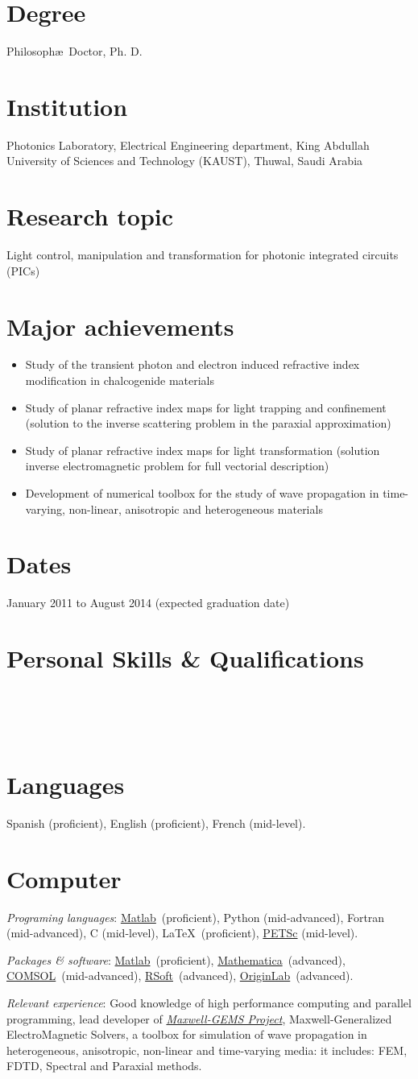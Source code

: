 \documentclass[margin,10pt]{res}
\newcommand{\R}{\textsuperscript{\textregistered}}
\newcommand{\subs}[1]{\normalfont #1}
\newcommand{\httpmg}{http://github.com/damiansra/maxwell-gems}
\newcommand{\secs}[1]{\normalsize{\section{\subs{#1}}}}
\newcommand{\KAUST}{King Abdullah University of Sciences and Technology (KAUST)}
\begin{document}
\secs{Degree}
Philosoph\ae~Doctor, Ph. D.
\secs{Institution} 
Photonics Laboratory, Electrical Engineering department, \KAUST, Thuwal, Saudi Arabia
\secs{Research topic} 
Light control, manipulation and transformation for photonic integrated circuits (PICs)
\secs{Major achievements}
\begin{itemize}
	\item Study of the transient photon and electron induced refractive index modification in chalcogenide materials
	\item Study of planar refractive index maps for light trapping and confinement (solution to the inverse scattering problem in the paraxial approximation)
	\item Study of planar refractive index maps for light transformation (solution inverse electromagnetic problem for full vectorial description)
	\item Development of numerical toolbox for the study of wave propagation in time-varying, non-linear, anisotropic and heterogeneous materials  
\end{itemize} 

\secs{Dates} January 2011 to August 2014 (expected graduation date) \\


\section{Personal Skills \& Qualifications}

\secs{~~}
\secs{Languages}
Spanish (proficient), English (proficient), French (mid-level).

\secs{Computer}
\emph{Programing languages}: \href{http://www.matlab.com}{Matlab\R}~(proficient), Python (mid-advanced), Fortran (mid-advanced), C (mid-level), \LaTeX~(proficient), \href{http://www.mcs.anl.gov/petsc/}{PETSc} (mid-level).

\emph{Packages \& software}: \href{http://www.matlab.com}{Matlab\R}~(proficient), \href{http://www.wolfram.com/mathematica/}{Mathematica\R}~(advanced), \href{http://www.comsol.com}{COMSOL\R}~(mid-advanced), \href{http://www.rsoftdesign.com/}{RSoft\R}~(advanced), \href{http://www.originlab.com}{OriginLab\R}~(advanced).

\emph{Relevant experience}: Good knowledge of high performance computing and parallel programming, lead developer of \href{\httpmg}{\emph{Maxwell-GEMS Project}}, Maxwell-Generalized ElectroMagnetic Solvers, a toolbox for simulation of wave propagation  in heterogeneous, anisotropic, non-linear and time-varying media: it includes: FEM, FDTD, Spectral and Paraxial methods.
\end{document}

